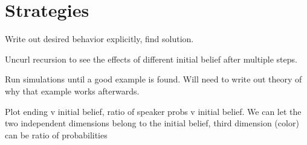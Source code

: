 \documentclass[12pt,fleqn,leqno,letterpaper]{article}
\begin{document}
\section{Strategies}
Write out desired behavior explicitly, find solution. 

Uncurl recursion to see the effects of different initial belief after multiple steps.

Run simulations until a good example is found. Will need to write out theory of why that example works afterwards.

Plot ending v initial belief, ratio of speaker probs v initial belief. We can let the two independent dimensions belong to the initial belief, third dimension (color) can be ratio of probabilities
\end{document}
